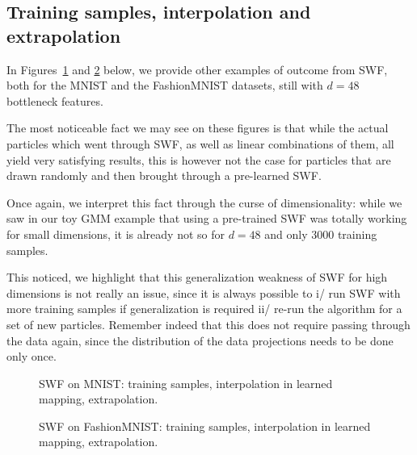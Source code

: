 \subsection{Training samples, interpolation and extrapolation}

In Figures~\ref{fig:suppmnistsamples} and \ref{fig:suppfmnistsamples} below, we provide other examples of outcome from SWF, both for the MNIST and the FashionMNIST datasets, still with $d=48$ bottleneck features.

The most noticeable fact we may see on these figures is that while the actual particles which went through SWF, as well as linear combinations of them, all yield very satisfying results, this is however not the case for particles that are drawn randomly and then brought through a pre-learned SWF.

Once again, we interpret this fact through the curse of dimensionality: while we saw in our toy GMM example that using a pre-trained SWF was totally working for small dimensions, it is already not so for $d=48$ and only $3000$ training samples.

This noticed, we highlight that this generalization weakness of SWF for high dimensions is not really an issue, since it is always possible to i/ run SWF with more training samples if generalization is required ii/ re-run the algorithm for a set of new particles. Remember indeed that this does not require passing through the data again, since the distribution of the data projections needs to be done only once.
\renewcommand{\picwidth}{0.3}%


\begin{figure}
\centering
{}
\caption{SWF on MNIST: training samples, interpolation in learned mapping, extrapolation.}
\label{fig:suppmnistsamples}
\end{figure}


\begin{figure}
\centering
{}
\caption{SWF on FashionMNIST: training samples, interpolation in learned mapping, extrapolation.}
\label{fig:suppfmnistsamples}
\end{figure}







